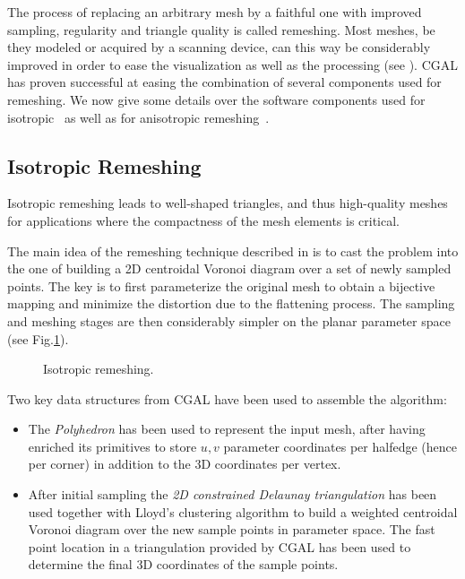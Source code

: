 \label{sec:remeshing}



The process of replacing an arbitrary mesh by a faithful one with
improved sampling, regularity and triangle quality is called
remeshing. Most meshes, be they modeled or acquired by a scanning
device, can this way be considerably improved in order to ease the
visualization as well as the processing (see \cite{ss-dgp-01}). CGAL
has proven successful at easing the combination of several components
used for remeshing. We now give some details over the software
components used for isotropic~\cite{acdi-isr-03} as well as for
anisotropic remeshing~\cite{acdld-apr-03}.

\subsection{Isotropic Remeshing}


Isotropic remeshing leads to well-shaped triangles, and thus
high-quality meshes for applications where the compactness of the mesh
elements is critical.


The main idea of the remeshing technique described in
\cite{acdi-isr-03} is to cast the problem into the
one of building a 2D centroidal Voronoi diagram over a set of newly
sampled points. The key is to first parameterize the original mesh to
obtain a bijective mapping and minimize the distortion due to the
flattening process. The sampling and meshing stages are then
considerably simpler on the planar parameter space (see
Fig.\ref{fig:isotropic}).

\begin{figure}
  \centering
  \caption{Isotropic remeshing.}
  \label{fig:isotropic}
\end{figure}



Two key data structures from CGAL have been used to assemble the
algorithm:

\begin{itemize}

\item 
The \emph{Polyhedron} has been used to represent the input mesh, after
having enriched its primitives to store $u,v$ parameter coordinates
per halfedge (hence per corner) in addition to the 3D coordinates per
vertex.

\item 
After initial sampling the \emph{2D constrained Delaunay
triangulation} has been used together with Lloyd's clustering
algorithm to build a weighted centroidal Voronoi diagram over the new
sample points in parameter space. The fast point location in a
triangulation provided by CGAL has been used to determine the final 3D
coordinates of the sample points.

\end{itemize}

